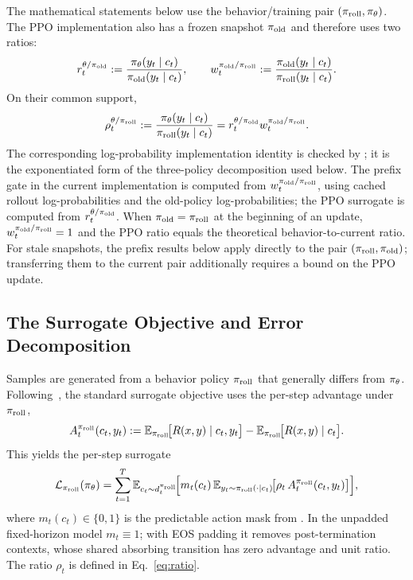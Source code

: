 \begin{remark}
The mathematical statements below use the behavior/training pair
$(\pi_{\mathrm{roll}},\pi_{\theta})$. The PPO implementation also has a frozen snapshot
$\pi_{\mathrm{old}}$ and therefore uses two ratios:
\begin{equation*}
    r_t^{\theta/\pi_{\mathrm{old}}}
    := \frac{\pi_{\theta}(y_t\mid c_t)}{\pi_{\mathrm{old}}(y_t\mid c_t)},
    \qquad
    w_t^{\pi_{\mathrm{old}}/\pi_{\mathrm{roll}}}
    := \frac{\pi_{\mathrm{old}}(y_t\mid c_t)}{\pi_{\mathrm{roll}}(y_t\mid c_t)}.
\end{equation*}
On their common support,
\begin{equation*}
    \rho_t^{\theta/\pi_{\mathrm{roll}}}
    := \frac{\pi_{\theta}(y_t\mid c_t)}{\pi_{\mathrm{roll}}(y_t\mid c_t)}
    = r_t^{\theta/\pi_{\mathrm{old}}} w_t^{\pi_{\mathrm{old}}/\pi_{\mathrm{roll}}}.
\end{equation*}
The corresponding log-probability implementation identity is checked by
; it is the
exponentiated form of the three-policy decomposition used below.
The prefix gate in the current implementation is computed from
$w_t^{\pi_{\mathrm{old}}/\pi_{\mathrm{roll}}}$, using cached rollout log-probabilities and the old-policy
log-probabilities; the PPO surrogate is computed from $r_t^{\theta/\pi_{\mathrm{old}}}$.
When $\pi_{\mathrm{old}}=\pi_{\mathrm{roll}}$ at the beginning of an update, $w_t^{\pi_{\mathrm{old}}/\pi_{\mathrm{roll}}}=1$
and the PPO ratio equals the theoretical behavior-to-current ratio. For stale snapshots, the prefix results below
apply directly to the pair $(\pi_{\mathrm{roll}},\pi_{\mathrm{old}})$; transferring them to the
current pair additionally requires a bound on the PPO update.
\end{remark}

\subsection{The Surrogate Objective and Error Decomposition}

Samples are generated from a behavior policy $\pi_{\mathrm{roll}}$ that generally differs from $\pi_{\theta}$. Following~\citet{kakade2002approximately},
the standard surrogate objective uses the per-step advantage under $\pi_{\mathrm{roll}}$,
\begin{equation*}
    A_t^{\pi_{\mathrm{roll}}}(c_t, y_t)
    := \mathbb{E}_{\pi_{\mathrm{roll}}}\!\big[R(x, y)\mid c_t, y_t\big] - \mathbb{E}_{\pi_{\mathrm{roll}}}\!\big[R(x, y)\mid c_t\big].
\end{equation*}
This yields the per-step surrogate
\begin{equation}
    \mathcal{L}_{\pi_{\mathrm{roll}}}(\pi_{\theta}) = \sum_{t=1}^T \mathbb{E}_{c_t \sim d_t^{\pi_{\mathrm{roll}}}}\!\Big[m_t(c_t)\,\mathbb{E}_{y_t \sim \pi_{\mathrm{roll}}(\cdot|c_t)}\!\big[\rho_t \, A_t^{\pi_{\mathrm{roll}}}(c_t, y_t)\big]\Big],
    \label{eq:surrogate}
\end{equation}
where $m_t(c_t)\in\{0,1\}$ is the predictable action mask from
. In the unpadded fixed-horizon model $m_t\equiv1$;
with EOS padding it removes post-termination contexts, whose shared absorbing
transition has zero advantage and unit ratio.
The ratio $\rho_t$ is defined in Eq.~\eqref{eq:ratio}.

